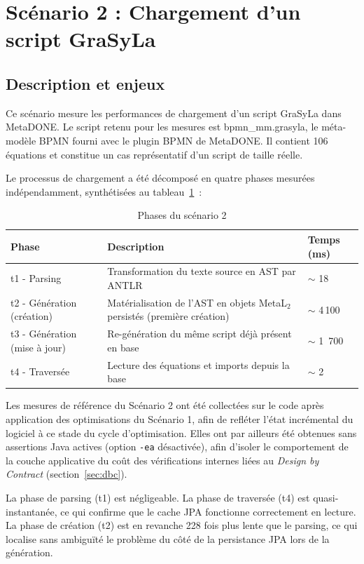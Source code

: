 \newpage
\section{Scénario 2 : Chargement d'un script GraSyLa}
\label{sec:scenario2}

\subsection{Description et enjeux}
Ce scénario mesure les performances de chargement d'un script GraSyLa dans MetaDONE. Le script retenu pour les mesures est bpmn\_mm.grasyla, le méta-modèle BPMN fourni avec le plugin BPMN de MetaDONE. Il contient 106 équations et constitue un cas représentatif d'un script de taille réelle.

Le processus de chargement a été décomposé en quatre phases mesurées indépendamment, synthétisées au tableau~\ref{tab:scenario2-phases}~:

\begin{table}[h]
\centering
\caption{Phases du scénario 2}
\label{tab:scenario2-phases}
\begin{tabularx}{\textwidth}{lXl}
\hline
\textbf{Phase} & \textbf{Description} & \textbf{Temps (ms)} \\
\hline
t1 - Parsing & Transformation du texte source en AST par ANTLR & $\sim$ 18\\
t2 - Génération (création) & Matérialisation de l'AST en objets MetaL$_2$ persistés (première création) & $\sim$ 4\,100\\
t3 - Génération (mise à jour) & Re-génération du même script déjà présent en base & $\sim$ 1~700\\
t4 - Traversée & Lecture des équations et imports depuis la base & $\sim$ 2\\
\hline
\end{tabularx}
\end{table}
Les mesures de référence du Scénario 2 ont été collectées sur le code après application des optimisations du Scénario 1, afin de refléter l'état incrémental du logiciel à ce stade du cycle d'optimisation. Elles ont par ailleurs été obtenues sans assertions Java actives (option \texttt{-ea} désactivée), afin d'isoler le comportement de la couche applicative du coût des vérifications internes liées au \emph{Design by Contract} (section~\ref{sec:dbc}).

La phase de parsing (t1) est négligeable. La phase de traversée (t4) est quasi-instantanée, ce qui confirme que le cache JPA fonctionne correctement en lecture. La phase de création (t2) est en revanche 228 fois plus lente que le parsing, ce qui localise sans ambiguïté le problème du côté de la persistance JPA lors de la génération.

